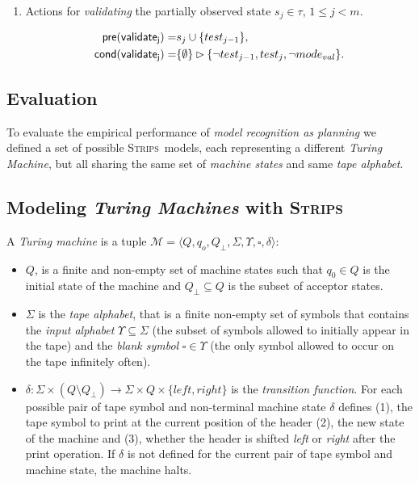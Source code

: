 \documentclass[letterpaper]{article} %
\newcommand{\tup}[1]{{\langle #1 \rangle}}
\newcommand{\pre}{\mathsf{pre}}     %
\newcommand{\cond}{\mathsf{cond}}   %
\newcommand{\strips}{\textsc{Strips}}     %
\begin{document}
\begin{itemize}
\begin{enumerate}
\item Actions for {\em validating} the partially observed state $s_j\in\tau$, {\tt\small $1\leq j< m$}.
\begin{small}
\begin{align*}
\hspace*{7pt}\pre(\mathsf{validate_{j}})=&s_j\cup\{test_{j-1}\},\\
\cond(\mathsf{validate_{j}})=&\{\emptyset\}\rhd\{\neg test_{j-1}, test_j,\neg mode_{val}\}.
\end{align*}
\end{small}
\end{enumerate}
\end{itemize}


\subsection{Evaluation}
\label{sec:evaluation}
To evaluate the empirical performance of {\em model recognition as planning} we defined a set of possible \strips\ models, each representing a different {\em Turing Machine}, but all sharing the same set of {\em machine states} and same {\em tape alphabet}. 

\subsection{Modeling {\em Turing Machines} with \strips\ }
A {\em Turing machine} is a tuple $\mathcal{M}=\tup{Q,q_o,Q_{\bot},\Sigma,\Upsilon,\square,\delta}$:
\begin{itemize}
\item $Q$, is a finite and non-empty set of machine states such that $q_0\in Q$ is the initial state of the machine and $Q_{\bot}\subseteq Q$ is the subset of acceptor states.  
\item $\Sigma$ is the {\em tape alphabet}, that is a finite non-empty set of symbols that contains the {\em input alphabet} $\Upsilon\subseteq\Sigma$ (the subset of symbols allowed to initially appear in the tape) and the {\em blank symbol} $\square\in\Upsilon$ (the only symbol allowed to occur on the tape infinitely often).
\item $\delta: \Sigma\times (Q\setminus Q_{\bot}) \rightarrow \Sigma\times Q\times\{left,right\}$ is the {\em transition function}. For each possible pair of tape symbol and non-terminal machine state $\delta$ defines (1), the tape symbol to print at the current position of the header (2), the new state of the machine and (3), whether the header is shifted {\em left} or {\em right} after the print operation. If $\delta$ is not defined for the current pair of tape symbol and machine state, the machine halts.
\end{itemize}
\end{document}
